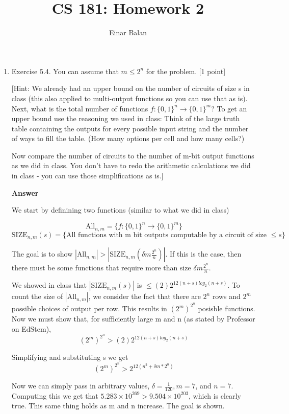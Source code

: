 \documentclass[11pt]{article}
\title{\bf{CS 181: Homework 2}}
\author{ Einar Balan}
\date{}
\newcommand \kw[1]{\textbf{#1}}
\newenvironment{answer}{
\vspace{.5cm}
\kw{Answer} 

}
{
\pagebreak
}
\begin{document}
\maketitle



\begin{enumerate}
\item Exercise 5.4. You can assume that $m \leq 2^n$ for the problem. [1 point]

[Hint: We already had an upper bound on the number of circuits of size s in class (this also applied to multi-output functions so you can use that as is). Next, what is the total number of functions $f:\{0,1\}^n \rightarrow \{0,1\}^m$? To get an upper bound use the reasoning we used in class: Think of the large truth table containing the outputs for every possible input string and the number of ways to fill the table. (How many options per cell and how many cells?)

Now compare the number of circuits to the number of m-bit output functions as we did in class. You don't have to redo the arithmetic calculations we did in class - you can use those simplifications as is.]

\begin{answer}
    
    We start by definining two functions (similar to what we did in class)

    \[
        \text{All}_{n,m} = \{ f: \{0, 1\}^n \rightarrow \{0, 1\}^m \}
    \]
    \[
        \text{SIZE}_{n, m}(s) = \{ \text{All functions with m bit outputs computable by a circuit of size } \le s\}
    \]

    The goal is to show $|\text{All}_{n,m}| > |\text{SIZE}_{n, m}(\delta m \frac{2^n}{n})|$. If this is the case, then there must be some functions that require more than size $\delta m \frac{2^n}{n}$.

    We showed in class that $|\text{SIZE}_{n, m}(s)|$ is $\le (2)2^{12(n + s)log_2(n+s)}$. To count the size of $|\text{All}_{n,m}|$, we consider the fact that there are $2^n$ rows and $2^m$ possible choices of output per row. This results in $(2^m)^{2^n}$ posisble functions. Now we must show that, for sufficiently large m and n (as stated by Professor on EdStem),
    \[
        (2^m)^{2^n} > (2)2^{12(n + s)log_2(n+s)}
    \]  

    Simplifying and substituting s we get 
    \[
        (2^m)^{2^n} > 2^{12(n^2 + \delta m * 2^n)}
    \]

    Now we can simply pass in arbitrary values, $\delta = \frac{1}{120}, m = 7$, and $n = 7$. Computing this we get that $5.283 \times 10^{269} > 9.504 \times 10^{203}$, which is clearly true. This same thing holds as m and n increase. The goal is shown.


\end{answer}
\end{enumerate}
\end{document}
